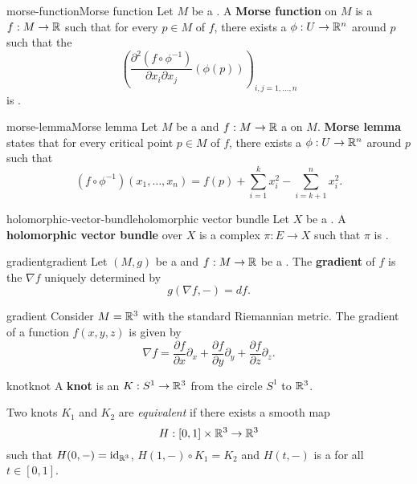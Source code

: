 \begin{topic}{morse-function}{Morse function}
    Let $M$ be a . A \textbf{Morse function} on $M$ is a  $f : M \to \mathbb{R}$ such that for every  $p \in M$ of $f$, there exists a  $\phi : U \to \mathbb{R}^n$ around $p$ such that the 
    \[ \left( \frac{\partial^2 (f \circ \phi^{-1})}{\partial x_i \partial x_j} (\phi(p)) \right)_{i, j = 1, \ldots, n} \]
    is .
\end{topic}

\begin{topic}{morse-lemma}{Morse lemma}
    Let $M$ be a  and $f : M \to \mathbb{R}$ a  on $M$. \textbf{Morse lemma} states that for every critical point $p \in M$ of $f$, there exists a  $\phi : U \to \mathbb{R}^n$ around $p$ such that
    \[ (f \circ \phi^{-1})(x_1, \ldots, x_n) = f(p) + \sum_{i = 1}^{k} x_i^2 - \sum_{i = k + 1}^{n} x_i^2 . \]
\end{topic}

\begin{topic}{holomorphic-vector-bundle}{holomorphic vector bundle}
    Let $X$ be a . A \textbf{holomorphic vector bundle} over $X$ is a complex  $\pi : E \to X$ such that $\pi$ is .
\end{topic}

\begin{topic}{gradient}{gradient}
    Let $(M, g)$ be a  and $f : M \to \mathbb{R}$ be a . The \textbf{gradient} of $f$ is the  $\nabla f$ uniquely determined by
    \[ g(\nabla f, -) = df . \]
\end{topic}

\begin{example}{gradient}
    Consider $M = \mathbb{R}^3$ with the standard Riemannian metric. The gradient of a function $f(x, y, z)$ is given by
    \[ \nabla f = \frac{\partial f}{\partial x} \partial_x + \frac{\partial f}{\partial y} \partial_y + \frac{\partial f}{\partial z} \partial_z . \]
\end{example}

\begin{topic}{knot}{knot}
    A \textbf{knot} is an  $K : S^1 \to \mathbb{R}^3$ from the circle $S^1$ to $\mathbb{R}^3$.

    Two knots $K_1$ and $K_2$ are \textit{equivalent} if there exists a smooth map
    \[ H : [0, 1] \times \mathbb{R}^3 \to \mathbb{R}^3 \]
    such that $H(0, -) = \textup{id}_{\mathbb{R}^3}$, $H(1, -) \circ K_1 = K_2$ and $H(t, -)$ is a  for all $t \in [0, 1]$.
\end{topic}


